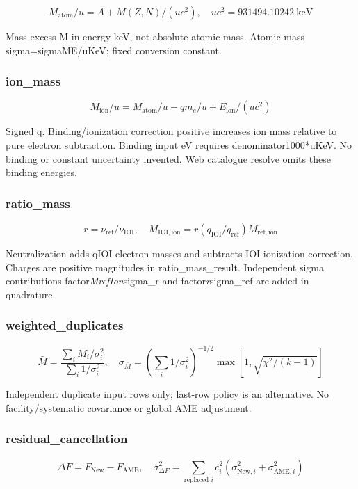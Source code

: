 \documentclass[
  11pt,
  letterpaper,
]{article}
\begin{document}
\[
M_{\mathrm{atom}}/u=A+M(Z,N)/(u c^2),\quad u c^2=931494.10242\ {\mathrm{keV}}
\]

Mass excess M in energy keV, not absolute atomic mass. Atomic mass
sigma=sigmaME/uKeV; fixed conversion constant.

\subsubsection{ion\_mass}\label{ion_mass}

\[
M_{\mathrm{ion}}/u=M_{\mathrm{atom}}/u-q m_e/u+E_{\mathrm{ion}}/(u c^2)
\]

Signed q. Binding/ionization correction positive increases ion mass
relative to pure electron subtraction. Binding input eV requires
denominator1000*uKeV. No binding or constant uncertainty invented. Web
catalogue resolve omits these binding energies.

\subsubsection{ratio\_mass}\label{ratio_mass}

\[
r=\nu_{\mathrm{ref}}/\nu_{\mathrm{IOI}},\quad M_{\mathrm{IOI,ion}}=r(q_{\mathrm{IOI}}/q_{\mathrm{ref}})M_{\mathrm{ref,ion}}
\]

Neutralization adds qIOI electron masses and subtracts IOI ionization
correction. Charges are positive magnitudes in ratio\_mass\_result.
Independent sigma contributions factor\emph{MrefIon}sigma\_r and
factor\emph{r}sigma\_ref are added in quadrature.

\subsubsection{weighted\_duplicates}\label{weighted_duplicates}

\[
\bar M=\frac{\sum_i M_i/\sigma_i^2}{\sum_i1/\sigma_i^2},\quad \sigma_{\bar M}=(\sum_i1/\sigma_i^2)^{-1/2}\max[1,\sqrt{\chi^2/(k-1)}]
\]

Independent duplicate input rows only; last-row policy is an
alternative. No facility/systematic covariance or global AME adjustment.

\subsubsection{residual\_cancellation}\label{residual_cancellation}

\[
\Delta F=F_{\mathrm{New}}-F_{\mathrm{AME}},\quad \sigma_{\Delta F}^2=\sum_{\text{replaced }i}c_i^2(\sigma_{{\mathrm{New}},i}^2+\sigma_{{\mathrm{AME}},i}^2)
\]
\end{document}
